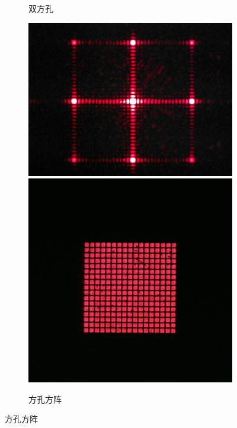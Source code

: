 \documentclass[a4paper]{article}
\begin{document}
\begin{figure}[H]
\begin{subfigure}[t]{0.3\textwidth}
        \caption{双方孔}
        \label{1-2}
    \end{subfigure}
    \begin{subfigure}[t]{0.3\textwidth}
        \centering
        \includegraphics[width=\textwidth]{fre-done/1-3.JPG}
        \includegraphics[width=\textwidth]{img-done/1-3.JPG}
        \caption{方孔方阵}
        \label{1-3}
    \end{subfigure}

\end{figure}
\end{document}
